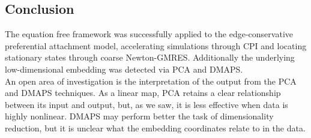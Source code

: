 \documentclass[12pt]{article}
\begin{document}
\begin{onehalfspace}
\section{Conclusion}

The equation free framework was successfully applied to the edge-conservative preferential attachment model, accelerating simulations through CPI and locating stationary states through coarse Newton-GMRES. Additionally the underlying low-dimensional embedding was detected via PCA and DMAPS. \\

An open area of investigation is the interpretation of the output from the PCA and DMAPS techniques. As a linear map, PCA retains a clear relationship between its input and output, but, as we saw, it is less effective when data is highly nonlinear. DMAPS may perform better the task of dimensionality reduction, but it is unclear what the embedding coordinates relate to in the data.


 




\end{onehalfspace}



\end{document}
